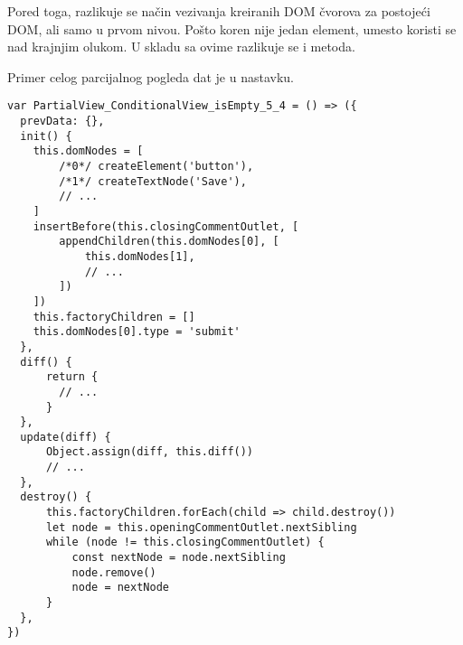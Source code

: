Pored toga, razlikuje se način vezivanja kreiranih DOM čvorova za postojeći DOM, ali samo u prvom nivou.
Pošto koren nije jedan element, umesto  koristi se  nad krajnjim olukom.
U skladu sa ovime razlikuje se i  metoda.

Primer celog parcijalnog pogleda dat je u nastavku.

\begin{lstlisting}
var PartialView_ConditionalView_isEmpty_5_4 = () => ({
  prevData: {},
  init() {
    this.domNodes = [
        /*0*/ createElement('button'),
        /*1*/ createTextNode('Save'),
        // ...
    ]
    insertBefore(this.closingCommentOutlet, [
        appendChildren(this.domNodes[0], [
            this.domNodes[1],
            // ...
        ])
    ])
    this.factoryChildren = []
    this.domNodes[0].type = 'submit'
  },
  diff() {
      return {
        // ...
      }
  },
  update(diff) {
      Object.assign(diff, this.diff())
      // ...
  },
  destroy() {
      this.factoryChildren.forEach(child => child.destroy())
      let node = this.openingCommentOutlet.nextSibling
      while (node != this.closingCommentOutlet) {
          const nextNode = node.nextSibling
          node.remove()
          node = nextNode
      }
  },
})
\end{lstlisting}

 